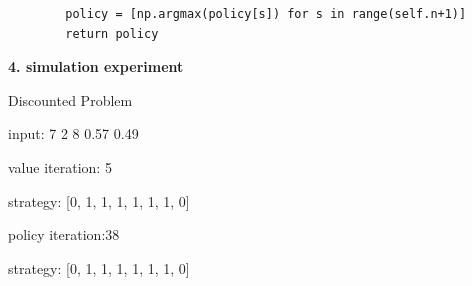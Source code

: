 \documentclass{assignment}
\begin{document}
\begin{problemlist}
\begin{problem}
\begin{answer}
\begin{lstlisting}
        policy = [np.argmax(policy[s]) for s in range(self.n+1)]
        return policy
  \end{lstlisting}
%       

\begin{flushleft}
 \large \textbf{4. simulation experiment}
\end{flushleft}
Discounted Problem

input: 7 2 8 0.57 0.49

value iteration: 5 

strategy: [0, 1, 1, 1, 1, 1, 1, 0] 

policy iteration:38

strategy: [0, 1, 1, 1, 1, 1, 1, 0] 


\end{answer}
\end{problem}








\end{problemlist}
\end{document}
